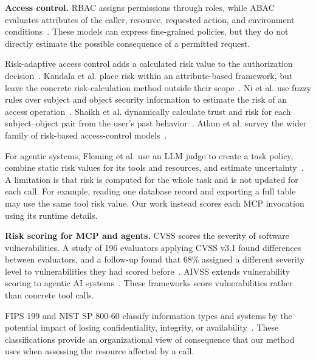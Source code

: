 \textbf{Access control.}
RBAC assigns permissions through roles, while ABAC evaluates attributes of the
caller, resource, requested action, and environment
conditions~\cite{sandhu1996rbac,hu2014abac}. These models can express
fine-grained policies, but they do not directly estimate the possible
consequence of a permitted request.

Risk-adaptive access control adds a calculated risk value to the authorization
decision~\cite{cheng2007fuzzymls}. Kandala et al. place risk within an
attribute-based framework, but leave the concrete risk-calculation method
outside their scope~\cite{kandala2011radac}. Ni et al. use fuzzy rules over
subject and object security information to estimate the risk of an access
operation~\cite{ni2010fuzzy}. Shaikh et al. dynamically calculate trust and
risk for each subject--object pair from the user's past
behavior~\cite{shaikh2012dynamic}. Atlam et al. survey the wider family of
risk-based access-control models~\cite{atlam2020riskbased}.

For agentic systems, Fleming et al. use an LLM judge to create a task policy,
combine static risk values for its tools and resources, and estimate
uncertainty~\cite{fleming2025tbac}. A limitation is that risk is computed for
the whole task and is not updated for each call. For example, reading one
database record and exporting a full table may use the same tool risk value.
Our work instead scores each MCP invocation using its runtime details.

\textbf{Risk scoring for MCP and agents.}
CVSS scores the severity of software vulnerabilities. A study of 196 evaluators
applying CVSS v3.1 found differences between evaluators, and a follow-up found
that 68\% assigned a different severity level to vulnerabilities they had
scored before~\cite{first2023cvss,wunder2024cvss}. AIVSS extends vulnerability
scoring to agentic AI systems~\cite{owasp2026aivss}. These frameworks score
vulnerabilities rather than concrete tool calls.

FIPS 199 and NIST SP 800-60 classify information types and systems by the
potential impact of losing confidentiality, integrity, or
availability~\cite{nist2004fips199,nist2008sp80060}. These classifications
provide an organizational view of consequence that our method uses when
assessing the resource affected by a call.

